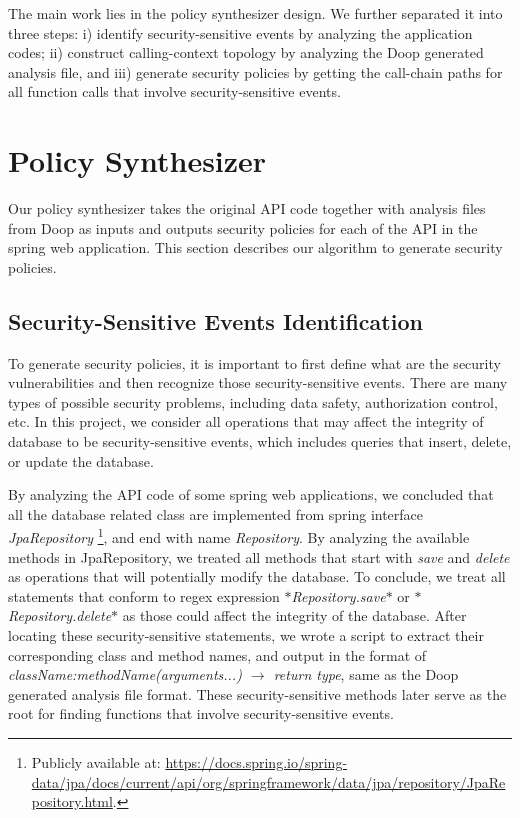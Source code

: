 The main work lies in the policy synthesizer design. We further separated it
into three steps: i) identify security-sensitive events by analyzing the
application codes;  ii) construct calling-context topology by analyzing the
Doop generated analysis file, and iii) generate security policies by getting
the call-chain paths for all function calls that involve security-sensitive
events.

\section{Policy Synthesizer}
\label{sec:policy}

Our policy synthesizer takes the original API code together with analysis files
from Doop as inputs and outputs security policies for each of the API in the
spring web application.
%
This section describes our algorithm to generate security policies.
%

\subsection{Security-Sensitive Events Identification}
To generate security policies, it is important to first define what are the
security vulnerabilities and then recognize those security-sensitive events.
There are many types of possible security problems, including data safety,
authorization control, etc. In this project, we consider all operations that may
affect the integrity of database to be security-sensitive events, which includes
queries that insert, delete, or update the database.

By analyzing the API code of some spring web applications, we concluded that
all the database related class are implemented from spring interface
\textit{JpaRepository} \footnote{Publicly available at:
  \url{https://docs.spring.io/spring-data/jpa/docs/current/api/org/springframework/data/jpa/repository/JpaRepository.html}.},
and end with name \textit{Repository}. By analyzing the available methods in
JpaRepository, we treated all methods that start with \textit{save} and
\textit{delete} as operations that will potentially modify the database. To
conclude, we treat all statements that conform to regex expression
\textit{$*$Repository.save$*$} or \textit{$*$Repository.delete$*$} as those
could affect the integrity of the database. After locating these
security-sensitive statements, we wrote a script to extract their corresponding
class and method names, and output in the format of
\textit{className:methodName(arguments...) $\rightarrow$ return type}, same as
the Doop generated analysis file format. These security-sensitive methods later
serve as the root for finding functions that involve security-sensitive events.


